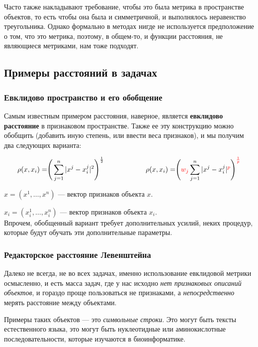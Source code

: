 \documentclass{article}
\begin{document}
Часто также накладывают требование, чтобы это была метрика в пространстве объектов, то есть чтобы она была и симметричной, и выполнялось неравенство треугольника. Однако формально в методах нигде не используется предположение о том, что это метрика, поэтому, в общем-то, и функции расстояния, не являющиеся метриками, нам тоже подходят.

\subsection{Примеры расстояний в задачах}
\subsubsection{Евклидово пространство и его обобщение}

Самым известным примером расстояния, наверное, является \textbf{евклидово расстояние} в признаковом пространстве. Также ее эту конструкцию можно обобщить (добавить иную степень, или ввести веса признаков), и мы получим два следующих варианта:

$$\rho(x, x_i) = \Biggr(\sum\limits_{j = 1}^n |x^j - x_i^j|^2\Biggl)^\frac{1}{2}
\qquad\qquad\qquad
\rho(x, x_i) = \Biggr(\textcolor{red}{w_j}
\sum\limits_{j = 1}^n |x^j - x_i^j|^{\textcolor{red}{p}}
\Biggl)^{\textcolor{red}{\frac{1}{p}}}$$

$x = (x^1, \ldots, x^n)$ --- вектор признаков объекта $x$.

$x_i = (x_i^1, \ldots, x_i^n)$ --- вектор признаков объекта $x_i$.
\\

Впрочем, обобщенный вариант требует дополнительных усилий, неких процедур, которые будут обучать эти дополнительные параметры.

\subsubsection{Редакторское расстояние Левенштейна}

Далеко не всегда, не во всех задачах, именно использование евклидовой метрики осмысленно, и есть масса задач, где у нас исходно \textit{нет признаковых описаний объектов}, и гораздо проще пользоваться не признаками, а \textit{непосредственно} мерять расстояние между объектами. 

Примеры таких объектов --- это \textit{символьные строки}. Это могут быть тексты естественного языка, это могут быть нуклеотидные или аминокислотные последовательности, которые изучаются в биоинформатике. 
\\
\end{document}
